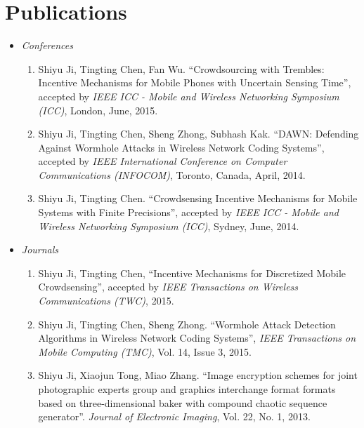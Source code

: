 \documentclass{article}
\begin{document}
\section{{Publications}}
\begin{itemize}
\item {\it Conferences}
\begin{enumerate}
\item Shiyu Ji, Tingting Chen, Fan Wu. ``Crowdsourcing with Trembles: Incentive Mechanisms for Mobile Phones with Uncertain Sensing Time'', accepted by {\it IEEE ICC - Mobile and Wireless Networking Symposium (ICC)}, London, June, 2015.

\item Shiyu Ji, Tingting Chen, Sheng Zhong, Subhash Kak. ``DAWN: Defending Against Wormhole Attacks in Wireless Network Coding Systems'', accepted by {\it IEEE International Conference on Computer Communications (INFOCOM)}, Toronto, Canada, April, 2014.

\item Shiyu Ji, Tingting Chen. ``Crowdsensing Incentive Mechanisms for Mobile Systems with Finite Precisions'', accepted by {\it IEEE ICC - Mobile and Wireless Networking Symposium (ICC)}, Sydney, June, 2014.
\end{enumerate}

\item{\it Journals}
\begin{enumerate}
\item Shiyu Ji, Tingting Chen, ``Incentive Mechanisms for Discretized Mobile Crowdsensing'', accepted by {\it IEEE Transactions on Wireless Communications (TWC)}, 2015.

\item Shiyu Ji, Tingting Chen, Sheng Zhong. ``Wormhole Attack Detection Algorithms in Wireless Network Coding Systems'', {\it IEEE Transactions on Mobile Computing (TMC)}, Vol. 14, Issue 3, 2015.

\item Shiyu Ji, Xiaojun Tong, Miao Zhang. ``Image encryption schemes for joint photographic experts group and graphics interchange format formats based on three-dimensional baker with compound chaotic sequence generator''. {\it Journal of Electronic Imaging}, Vol. 22, No. 1, 2013.
\end{enumerate}
\end{itemize}
\end{document}
